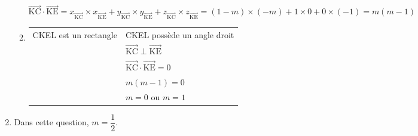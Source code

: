 \documentclass[10pt]{article}
\providecommand{\vectt}[1]{\overrightarrow{\mathrm{#1}}}
\begin{document}
\begin{enumerate}[resume]
\begin{enumerate}
$\vectt{KC} \cdot \vectt{KE} 
= x_{\vectt{KC}}\times x_{\vectt{KE}} + y_{\vectt{KC}}\times y_{\vectt{KE}}  + z_{\vectt{KC}}\times z_{\vectt{KE}} 
= (1-m)\times (-m) + 1 \times 0 + 0 \times (-1)
= m(m - 1)$	
		
		\item
\begin{tabular}[t]{@{} l @{ si, et seulement si, } l}
CKEL est un rectangle & CKEL possède un angle droit\\
&$\vectt{KC} \perp \vectt{KE}$\\
& $\vectt{KC} \cdot \vectt{KE}=0$\\
& $m(m-1)=0$\\
&$m = 0$ ou $m = 1$
\end{tabular}	

\end{enumerate}
\item Dans cette question, $m = \dfrac12$. 


\end{enumerate}
\end{document}
